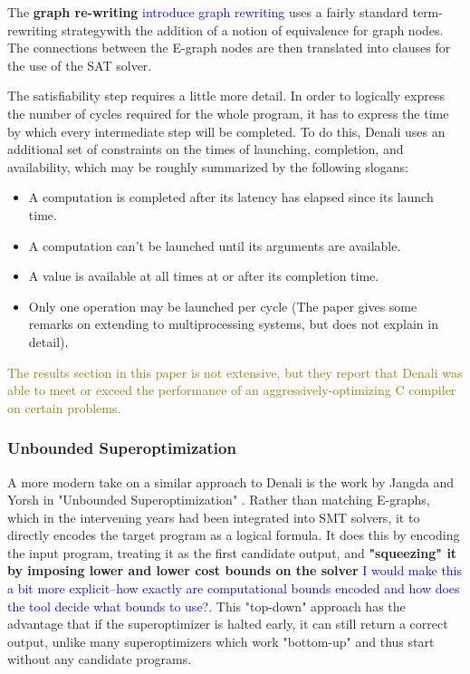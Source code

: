 \documentclass[12pt,twoside]{reedthesis}
\newcommand{\green}[1]{\textcolor{olive}{#1}}
\newcommand{\comment}[2]{\textbf{#1} \textcolor{blue}{#2}}
\begin{document}
            The \comment{graph re-writing}{introduce graph rewriting} uses a fairly standard term-rewriting strategy\footnotemark with the addition of a notion of equivalence for graph nodes.
            The connections between the E-graph nodes are then translated into clauses for the use of the SAT solver.
                
                
            The satisfiability step requires a little more detail.
            In order to logically express the number of cycles required for the whole program, it has to express the time by which every intermediate step will be completed.
            To do this, Denali uses an additional set of constraints on the times of launching, completion, and availability, which may be roughly summarized by the following slogans:
            \begin{itemize}
                \item A computation is completed after its latency has elapsed since its launch time.
                \item A computation can't be launched until its arguments are available.
                \item A value is available at all times at or after its completion time.
                \item Only one operation may be launched per cycle (The paper gives some remarks on extending to multiprocessing systems, but does not explain in detail).
            \end{itemize}
                
            \green{
            The results section in this paper is not extensive, but they report that Denali was able to meet or exceed the performance of an aggressively-optimizing C compiler on certain problems.
            }

        \subsubsection{Unbounded Superoptimization}
            A more modern take on a similar approach to Denali is the work by Jangda and Yorsh in "Unbounded Superoptimization" \cite{jangda2017unbounded}.
            Rather than matching E-graphs, which in the intervening years had been integrated into SMT solvers, it to directly encodes the target program as a logical formula.
            It does this by encoding the input program, treating it as the first candidate output, and
                \comment{"squeezing" it by imposing lower and lower cost bounds on the solver}{I would make this a bit more explicit--how exactly are computational bounds encoded and how does the tool decide what bounds to use?}.
            This "top-down" approach has the advantage that if the superoptimizer is halted early, it can still return a correct output, unlike many superoptimizers which work "bottom-up" and thus start without any candidate programs.
\end{document}
